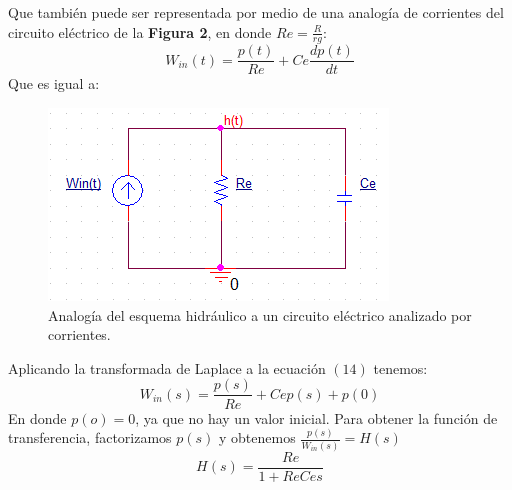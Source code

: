 \documentclass[letterpaper]{article}
\begin{document}
	 \newpage
	 Que también puede ser representada por medio de una analogía de corrientes del circuito eléctrico de la \textbf{Figura 2}, en donde $ Re =\frac{R}{rg}$:
	 \begin{equation}
	 W_{in}(t)=\frac{p(t)}{Re}+Ce\frac{dp(t)}{dt}
	 \end{equation}
	 Que es igual a:
	 \begin{figure}[h!]
	 	\centering
	 	\includegraphics[scale=.9]{cir}
	 	\caption{Analogía del esquema hidráulico a un circuito eléctrico analizado por corrientes.}
	 \end{figure}
 	\FloatBarrier
 	Aplicando la transformada de Laplace a la ecuación $ (14) $ tenemos:
 	\begin{equation}
 	W_{in}(s)=\frac{p(s)}{Re}+Cep(s)+p(0)
 	\end{equation}
 	En donde $ p(o) = 0$, ya que no hay un valor inicial. Para obtener la función de transferencia, factorizamos $ p(s) $ y obtenemos $ \frac{p(s)}{W_{in}(s)}=H(s) $
 	\begin{equation}
 	H(s)=\frac{Re}{1+ReCes}
 	\end{equation}
 	
 	\newpage
\end{document}
